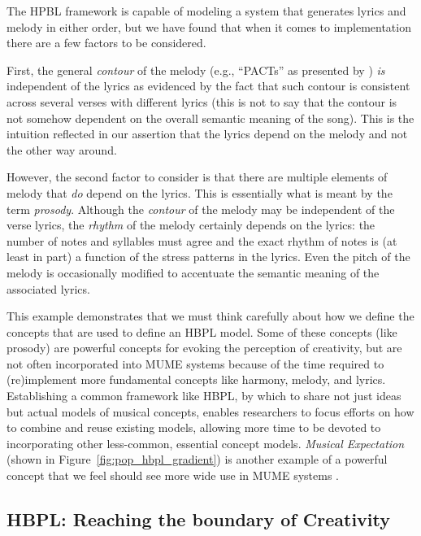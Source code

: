 \documentclass[letterpaper]{article}
\begin{document}
The HPBL framework is capable of modeling a system that generates lyrics and melody in either order, but we have found that when it comes to implementation there are a few factors to be considered.

First, the general \emph{contour} of the melody (e.g., ``PACTs'' as presented by \citeauthor{pachet1991representing} ) \emph{is} independent of the lyrics as evidenced by the fact that such contour is consistent across several verses with different lyrics (this is not to say that the contour is not somehow dependent on the overall semantic meaning of the song). This is the intuition reflected in our assertion that the lyrics depend on the melody and not the other way around.

However, the second factor to consider is that there are multiple elements of melody that \emph{do} depend on the lyrics. This is essentially what is meant by the term \emph{prosody}. Although the \emph{contour} of the melody may be independent of the verse lyrics, the \emph{rhythm} of the melody certainly depends on the lyrics: the number of notes and syllables must agree and the exact rhythm of notes is (at least in part) a function of the stress patterns in the lyrics. Even the pitch of the melody is occasionally modified to accentuate the semantic meaning of the associated lyrics.

This example demonstrates that we must think carefully about how we define the concepts that are used to define an HBPL model. Some of these concepts (like prosody) are powerful concepts for evoking the perception of creativity, but are not often incorporated into MUME systems because of the time required to (re)implement more fundamental concepts like harmony, melody, and lyrics. Establishing a common framework like HBPL, by which to share not just ideas but actual models of musical concepts, enables researchers to focus efforts on how to combine and reuse existing models, allowing more time to be devoted to incorporating other less-common, essential concept models. \emph{Musical Expectation} (shown in Figure~\ref{fig:pop_hbpl_gradient}) is another example of a powerful concept that we feel should see more wide use in MUME systems \cite{meyer2008emotion}.

\subsection{HBPL: Reaching the boundary of Creativity}
\end{document}
